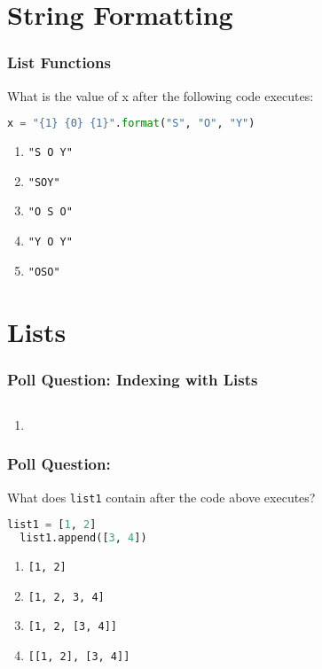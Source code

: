 \documentclass{beamer}
\begin{document}
\section{String Formatting}

\begin{frame}[fragile]
  \frametitle{List Functions}
  What is the value of x after the following code executes:
  \begin{lstlisting}[language=Python] 
  x = "{1} {0} {1}".format("S", "O", "Y")
  \end{lstlisting}
  \begin{enumerate}[A] 
    \item \lstinline|"S O Y"|
    \item \lstinline|"SOY"|
    \item \lstinline|"O S O"| %
    \item \lstinline|"Y O Y"|
    \item \lstinline|"OSO"|
  \end{enumerate}
\end{frame}

\section{Lists}
%
%
\begin{frame}[fragile]
  \frametitle{Poll Question: Indexing with Lists}
  \begin{lstlisting}
  \end{lstlisting}
  \begin{enumerate}[A] 
    \item 
  \end{enumerate}
\end{frame}



%
%
\begin{frame}[fragile]
  \frametitle{Poll Question: }
  What does \lstinline|list1| contain after the code above executes?
  \begin{lstlisting}[language=Python]
  list1 = [1, 2]
  list1.append([3, 4])
  \end{lstlisting}
  \vfill
  \begin{enumerate}[A] 
    \item \lstinline|[1, 2]|
    \item \lstinline|[1, 2, 3, 4]|
    \item \lstinline|[1, 2, [3, 4]]| %
    \item \lstinline|[[1, 2], [3, 4]]|
  \end{enumerate}
  \
\end{frame}
\end{document}
